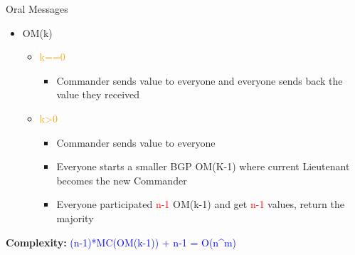 \documentclass{beamer}
\begin{document}
    \begin{frame}{Oral Messages}
        \begin{itemize}
         \item \large OM(k)
            \begin{itemize}
                \item \textcolor{orange}{k==0}
                        \begin{itemize}
                            \item Commander sends value to everyone and everyone sends back the value they received
                            \pause
                        \end{itemize}
                \item \textcolor{orange}{k>0}
                        \begin{itemize}
                            \item Commander sends value to everyone
                            \item Everyone starts a smaller BGP \alert{OM(K-1)} where current Lieutenant becomes the new Commander
                            \item Everyone participated \textcolor{red}{n-1} \alert{OM(k-1)} and get \textcolor{red}{n-1} values, return the majority
                        \end{itemize}
            \end{itemize}
            \pause
    \end{itemize}
    \textbf{Complexity:}\textcolor{Blue}{ (n-1)*MC(OM(k-1)) + n-1 = O(n^m)}
\end{frame}
\end{document}
